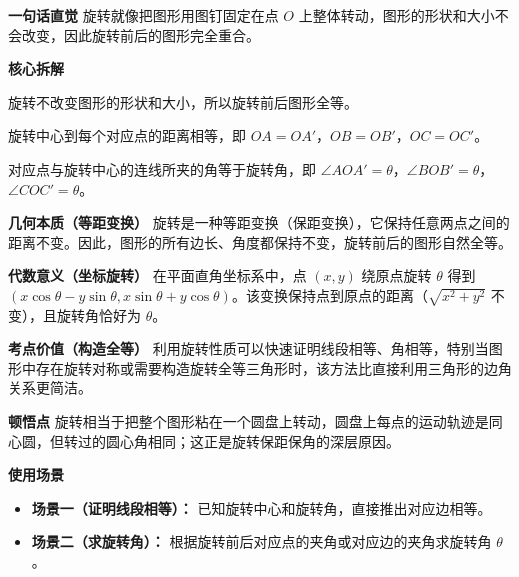 \begin{explanationbox}
	\textbf{\textcolor{CExplanation}{一句话直觉}}
	旋转就像把图形用图钉固定在点 $O$ 上整体转动，图形的形状和大小不会改变，因此旋转前后的图形完全重合。

	\medskip
	\textbf{\textcolor{CExplanation}{核心拆解}}
	\begin{description}[style=nextline, leftmargin=2.8em, labelsep=0.5em, itemsep=0.45em]
		\item[\textbf{要点一（全等性）：}]
			旋转不改变图形的形状和大小，所以旋转前后图形全等。
		\item[\textbf{要点二（距等性）：}]
			旋转中心到每个对应点的距离相等，即 $OA=OA'$，$OB=OB'$，$OC=OC'$。
		\item[\textbf{要点三（角等性）：}]
			对应点与旋转中心的连线所夹的角等于旋转角，即 $\angle AOA' = \theta$，$\angle BOB' = \theta$，$\angle COC' = \theta$。
	\end{description}

	\medskip
	\textbf{\textcolor{CExplanation}{几何本质（等距变换）}}
	旋转是一种等距变换（保距变换），它保持任意两点之间的距离不变。因此，图形的所有边长、角度都保持不变，旋转前后的图形自然全等。

	\medskip
	\textbf{\textcolor{CExplanation}{代数意义（坐标旋转）}}
	在平面直角坐标系中，点 $(x,y)$ 绕原点旋转 $\theta$ 得到 $(x\cos\theta - y\sin\theta, x\sin\theta + y\cos\theta)$。该变换保持点到原点的距离（$\sqrt{x^2+y^2}$ 不变），且旋转角恰好为 $\theta$。

	\medskip
	\textbf{\textcolor{CExplanation}{考点价值（构造全等）}}
	利用旋转性质可以快速证明线段相等、角相等，特别当图形中存在旋转对称或需要构造旋转全等三角形时，该方法比直接利用三角形的边角关系更简洁。

	\medskip
	\textbf{\textcolor{CExplanation}{顿悟点}}
	旋转相当于把整个图形粘在一个圆盘上转动，圆盘上每点的运动轨迹是同心圆，但转过的圆心角相同；这正是旋转保距保角的深层原因。

	\medskip
	\textbf{\textcolor{CExplanation}{使用场景}}
	\begin{itemize}[leftmargin=*, itemsep=0.5em, topsep=0.4em]
		\item \textbf{场景一（证明线段相等）：} 已知旋转中心和旋转角，直接推出对应边相等。
		\item \textbf{场景二（求旋转角）：} 根据旋转前后对应点的夹角或对应边的夹角求旋转角 $\theta$。
	\end{itemize}

\end{explanationbox}
